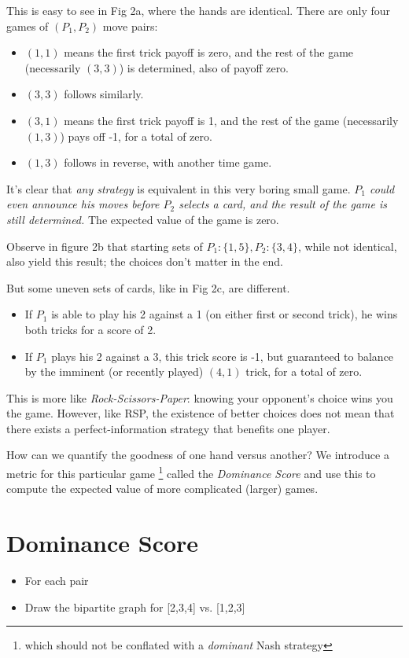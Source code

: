 \documentclass[11pt, oneside]{article} 	%
\begin{document}
This is easy to see in Fig 2a, where the hands are identical.  There are only four games of $(P_1, P_2)$ move pairs:
\begin{itemize}
\item $(1,1)$ means the first trick payoff is zero, and the rest of the game (necessarily $(3,3)$) is determined, also of payoff zero.
\item $(3,3)$ follows similarly.
\item $(3,1)$ means the first trick payoff is 1, and the rest of the game (necessarily $(1,3)$) pays off -1, for a total of zero.
\item $(1,3)$ follows in reverse, with another time game.
\end{itemize}

It's clear that \emph{any strategy} is equivalent in this very boring small game.  \emph{$P_1$ could even announce his moves before $P_2$ selects a card, and the result of the game is still determined.}  The expected value of the game is zero.

Observe in figure 2b that starting sets of $P_1: \{1,5\}, P_2: \{3,4\}$, while not identical, also yield this result; the choices don't matter in the end.

But some uneven sets of cards, like in Fig 2c, are different.
\begin{itemize}
\item If $P_1$ is able to play his 2 against a 1 (on either first or second trick), he wins both tricks for a score of 2.
\item If $P_1$ plays his 2 against a 3, this trick score is -1, but guaranteed to balance by the imminent (or recently played) $(4,1)$ trick, for a total of zero.
\end{itemize}

This is more like \emph{Rock-Scissors-Paper}: knowing your opponent's choice wins you the game.  However, like RSP, the existence of better choices does not mean that there exists a perfect-information strategy that benefits one player.

How can we quantify the goodness of one hand versus another?  We introduce a metric for this particular game \footnote{which should not be conflated with a \emph{dominant} Nash strategy} called the \emph{Dominance Score} and use this to compute the expected value of more complicated (larger) games.

\section{Dominance Score}
\begin{itemize}
\item For each pair
\item Draw the bipartite graph for [2,3,4] vs. [1,2,3]
\end{itemize}
\end{document}
